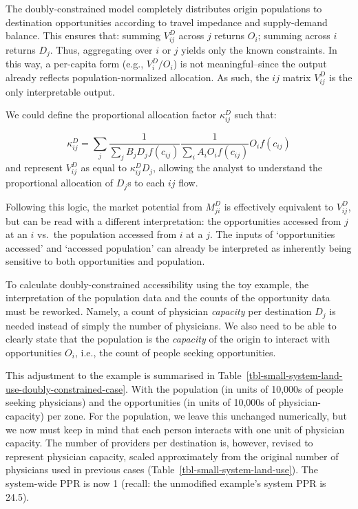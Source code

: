 \documentclass[
  10pt,
  letterpaper,
]{article}
\begin{document}
The doubly-constrained model completely distributes origin populations
to destination opportunities according to travel impedance and
supply-demand balance. This ensures that: summing \(V^D_{ij}\) across
\(j\) returns \(O_i\); summing across \(i\) returns \(D_j\). Thus,
aggregating over \(i\) or \(j\) yields only the known constraints. In
this way, a per-capita form (e.g., \(V^D_i / O_i\)) is not
meaningful--since the output already reflects population-normalized
allocation. As such, the \(ij\) matrix \(V^D_{ij}\) is the only
interpretable output.

We could define the proportional allocation factor \(\kappa_{ij}^D\)
such that:

\[
\kappa_{ij}^D = \sum_j \frac{1}{\sum_j B_j D_j f(c_{ij})} \frac{1}{\sum_i A_i O_i f(c_{ij})} O_i f(c_{ij})
\] \noindent and represent \(V^D_{ij}\) as equal to
\(\kappa^D_{ij} D_j\), allowing the analyst to understand the
proportional allocation of \(D_j\)s to each \(ij\) flow.

Following this logic, the market potential from \(M^D_{ji}\) is
effectively equivalent to \(V_{ij}^D\), but can be read with a different
interpretation: the opportunities accessed from \(j\) at an \(i\)
vs.~the population accessed from \(i\) at a \(j\). The inputs of
`opportunities accessed' and `accessed population' can already be
interpreted as inherently being sensitive to both opportunities and
population.

To calculate doubly-constrained accessibility using the toy example, the
interpretation of the population data and the counts of the opportunity
data must be reworked. Namely, a count of physician \emph{capacity} per
destination \(D_j\) is needed instead of simply the number of
physicians. We also need to be able to clearly state that the population
is the \emph{capacity} of the origin to interact with opportunities
\(O_i\), i.e., the count of people seeking opportunities.

This adjustment to the example is summarised in
Table~\ref{tbl-small-system-land-use-doubly-constrained-case}. With the
population (in units of 10,000s of people seeking physicians) and the
opportunities (in units of 10,000s of physician-capacity) per zone. For
the population, we leave this unchanged numerically, but we now must
keep in mind that each person interacts with one unit of physician
capacity. The number of providers per destination is, however, revised
to represent physician capacity, scaled approximately from the original
number of physicians used in previous cases
(Table~\ref{tbl-small-system-land-use}). The system-wide PPR is now 1
(recall: the unmodified example's system PPR is 24.5).
\end{document}
